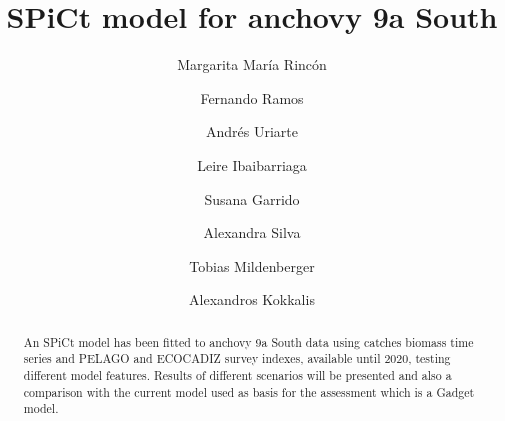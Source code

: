 \documentclass[review]{elsarticle}
\begin{document}


\begin{frontmatter}

\title{SPiCt model for anchovy 9a South}

\author[a]{Margarita Mar{\'i}a Rinc{\'o}n}
\address[a]{Department of Coastal Ecology and Management, Instituto de Ciencias Marinas de Andaluc{\'i}a, Consejo Superior de Investigaciones Cient{\'i}ficas, Avda Rep{\'u}blica Saharaui 2, 11519 Puerto Real, C{\'a}diz, Spain}
 

\author[b]{Fernando Ramos}
  
 

\address[b]{Instituto Español de Oceanograf{\'i}a, Centro Oceanográfico de Cádiz, Puerto
pesquero, Muelle de Levante s/n, Apdo. 2609, 11006 Cádiz, Spain}
     
  
\author[c]{Andrés Uriarte}

\address[c]{Azti-Tecnalia, Herrera Kaia-Portu aldea z/g, E-20110 Pasaia, Gipuzkoa, Basque Country, Spain}

\author[c]{Leire Ibaibarriaga}

\author[d]{Susana Garrido}

\address[d]{Instituto Portugues do Mar e da Atmosfera-IPMA, Av. Brasília, 6, 1449-006 Lisboa, Portugal}

\author[d]{Alexandra Silva}
\author[e]{Tobias Mildenberger}
\author[e]{Alexandros Kokkalis}
\address[e]{DTU Aqua}




\begin{abstract}
An SPiCt model has been fitted to anchovy 9a South data using catches biomass time series and PELAGO and ECOCADIZ survey indexes, available until 2020, testing different model features. Results of different scenarios will be presented and also a comparison with the current model used as basis for the assessment which is a Gadget model.
\end{abstract}


\end{frontmatter}
\end{document}
